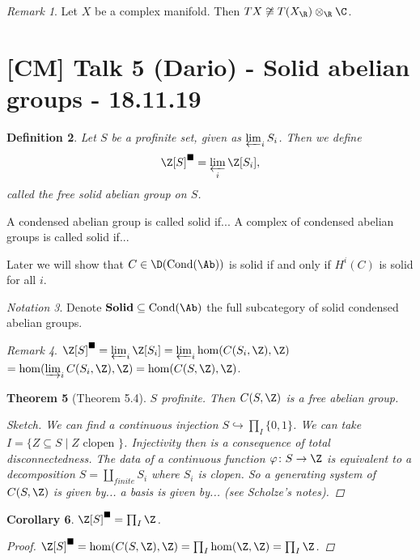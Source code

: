 \documentclass[A4paper, british]{amsart}
\theoremstyle{darkgreentheorem}
\newtheorem{thm}{Theorem}[section]
\newtheorem{cor}[thm]{Corollary}
\theoremstyle{darkbluedefinition}
\newtheorem{defn}[thm]{Definition}
\theoremstyle{darkredexample}
\theoremstyle{remark}
\newtheorem{rem}[thm]{Remark}
\newtheorem{nota}[thm]{Notation}
\DeclareMathOperator{\Cond}{Cond}
\newcommand{\Solid}{\mathbf{Solid}}
\newcommand{\1}{\mathbbm{1}}
\newcommand{\ot}{\otimes}
\newcommand{\sub}{\subseteq}
\newcommand{\mono}{\hookrightarrow}
\newcommand{\solid}{^{\blacksquare}}
\begin{document}
\begin{rem}
    Let $X$ be a complex manifold.
    Then $TX\not\cong T(X_{\R})\ot_{\R}\C$.
\end{rem}

\section{[CM] Talk 5 (Dario) - Solid abelian groups - 18.11.19}

\begin{defn}
    Let $S$ be a profinite set, given as $\varprojlim_{i} S_{i}$.
    Then we define
    \[ \Z[S]\solid=\varprojlim_{i}\Z[S_{i}],\]
    called the free solid abelian group on $S$.
\end{defn}

A condensed abelian group is called solid if...
A complex of condensed abelian groups is called solid if...

Later we will show that $C\in \D(\Cond(\Ab))$ is solid if and only if $H^{i}(C)$ is solid for all $i$.

\begin{nota}
    Denote $\Solid\sub \Cond(\Ab)$ the full subcategory of solid condensed abelian groups.
\end{nota}

\begin{rem}
    $\Z[S]\solid=\varprojlim_{i}\Z[S_{i}]=\varprojlim_{i}\hom(C(S_{i},\Z),\Z)$$=\hom(\varinjlim_{i}C(S_{i},\Z),\Z)=\hom(C(S,\Z),\Z)$.
\end{rem}

\begin{thm}[Theorem 5.4]
    $S$ profinite.
    Then $C(S,\Z)$ is a free abelian group.
    \begin{proof}[Sketch]
	We can find a continuous injection $S\mono \prod_{I}\{0,1\}$.
	We can take $I=\{ Z \sub S\mid Z\text{ clopen }\}$.
	Injectivity then is a consequence of total disconnectedness.
	The data of a continuous function $\varphi\colon S\to \Z$ is equivalent to a decomposition $S=\coprod_{finite}S_{i}$ where $S_{i}$ is clopen.
	So a generating system of $C(S,\Z)$ is given by... a basis is given by... (see Scholze's notes).
    \end{proof}
\end{thm}

\begin{cor}
    $\Z[S]\solid=\prod_{I}\Z$.
    \begin{proof}
	$\Z[S]\solid=\hom(C(S,\Z),\Z)=\prod_{I}\hom(\Z,\Z)=\prod_{I}\Z$.
    \end{proof}
\end{cor}
\end{document}
